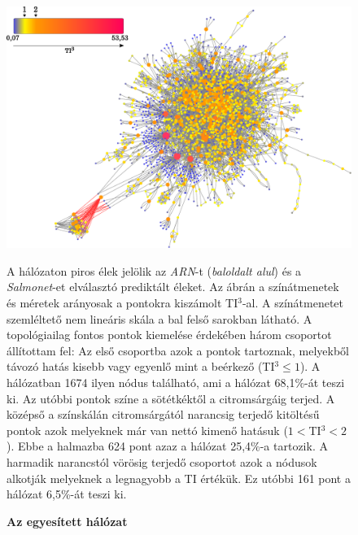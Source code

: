 \documentclass[a4paper,12pt]{article}
\newenvironment{imgdesc}{
		\small
		\singlespacing
		\begin{center}

	}{
		\end{center}
	}
\begin{document}
					\begin{figure}[H]
						\includegraphics[scale=0.6]{img/merged.pdf}
						\centering
						\caption{\textbf{ Az egyesített hálózat}}
						\begin{imgdesc}
							A hálózaton piros élek jelölik az \textit{ARN}-t (\textit{baloldalt alul}) és a \textit{Salmonet}-et elválasztó prediktált éleket. Az ábrán a színátmenetek és méretek arányosak a pontokra kiszámolt TI$^3$-al. A színátmenetet szemléltető nem lineáris skála a bal felső sarokban látható. A topológiailag fontos pontok kiemelése érdekében három csoportot állítottam fel: Az első csoportba azok a pontok tartoznak, melyekből távozó hatás kisebb vagy egyenlő mint a beérkező (TI$^3\leq1$). A hálózatban 1674 ilyen nódus található, ami a hálózat 68,1\%-át teszi ki. Az utóbbi pontok színe a sötétkéktől a citromsárgáig terjed. A középső a színskálán citromsárgától narancsig terjedő kitöltésű pontok azok melyeknek már van nettó kimenő hatásuk ($1<$TI$^3<2$). Ebbe a halmazba 624 pont azaz a hálózat 25,4\%-a tartozik. A harmadik narancstól vörösig terjedő csoportot azok a nódusok alkotják melyeknek a legnagyobb a TI értékük. Ez utóbbi 161 pont a hálózat 6,5\%-át teszi ki.
						\end{imgdesc}

						\label{fig:merged}
					\end{figure}
\end{document}
